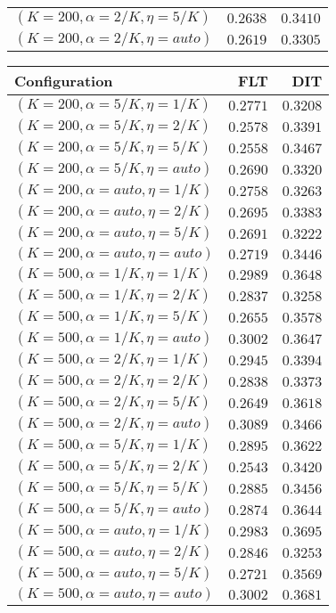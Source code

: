 \begin{table}
\begin{spacing}{1.2}
{\begin{tabular}{lrr}
   $(K=200,\alpha=2/K,\eta=5/K)$ & $0.2638$ & $0.3410$ \\
  $(K=200,\alpha=2/K,\eta=auto)$ & $0.2619$ & $0.3305$ \\
\bottomrule
\end{tabular}
} \hfill \parbox{.45\linewidth}{\centering \begin{tabular}{lrr}
\toprule
                   Configuration &           FLT &           DIT \\
\midrule
   $(K=200,\alpha=5/K,\eta=1/K)$ &      $0.2771$ &      $0.3208$ \\
   $(K=200,\alpha=5/K,\eta=2/K)$ &      $0.2578$ &      $0.3391$ \\
   $(K=200,\alpha=5/K,\eta=5/K)$ &      $0.2558$ &      $0.3467$ \\
  $(K=200,\alpha=5/K,\eta=auto)$ &      $0.2690$ &      $0.3320$ \\
  $(K=200,\alpha=auto,\eta=1/K)$ &      $0.2758$ &      $0.3263$ \\
  $(K=200,\alpha=auto,\eta=2/K)$ &      $0.2695$ &      $0.3383$ \\
  $(K=200,\alpha=auto,\eta=5/K)$ &      $0.2691$ &      $0.3222$ \\
 $(K=200,\alpha=auto,\eta=auto)$ &      $0.2719$ &      $0.3446$ \\
   $(K=500,\alpha=1/K,\eta=1/K)$ &      $0.2989$ &      $0.3648$ \\
   $(K=500,\alpha=1/K,\eta=2/K)$ &      $0.2837$ &      $0.3258$ \\
   $(K=500,\alpha=1/K,\eta=5/K)$ &      $0.2655$ &      $0.3578$ \\
  $(K=500,\alpha=1/K,\eta=auto)$ &      $0.3002$ &      $0.3647$ \\
   $(K=500,\alpha=2/K,\eta=1/K)$ &      $0.2945$ &      $0.3394$ \\
   $(K=500,\alpha=2/K,\eta=2/K)$ &      $0.2838$ &      $0.3373$ \\
   $(K=500,\alpha=2/K,\eta=5/K)$ &      $0.2649$ &      $0.3618$ \\
  $(K=500,\alpha=2/K,\eta=auto)$ & $\bm{0.3089}$ &      $0.3466$ \\
   $(K=500,\alpha=5/K,\eta=1/K)$ &      $0.2895$ &      $0.3622$ \\
   $(K=500,\alpha=5/K,\eta=2/K)$ &      $0.2543$ &      $0.3420$ \\
   $(K=500,\alpha=5/K,\eta=5/K)$ &      $0.2885$ &      $0.3456$ \\
  $(K=500,\alpha=5/K,\eta=auto)$ &      $0.2874$ &      $0.3644$ \\
  $(K=500,\alpha=auto,\eta=1/K)$ &      $0.2983$ & $\bm{0.3695}$ \\
  $(K=500,\alpha=auto,\eta=2/K)$ &      $0.2846$ &      $0.3253$ \\
  $(K=500,\alpha=auto,\eta=5/K)$ &      $0.2721$ &      $0.3569$ \\
 $(K=500,\alpha=auto,\eta=auto)$ &      $0.3002$ &      $0.3681$ \\
\bottomrule
\end{tabular}
}
\end{spacing}
\end{table}
